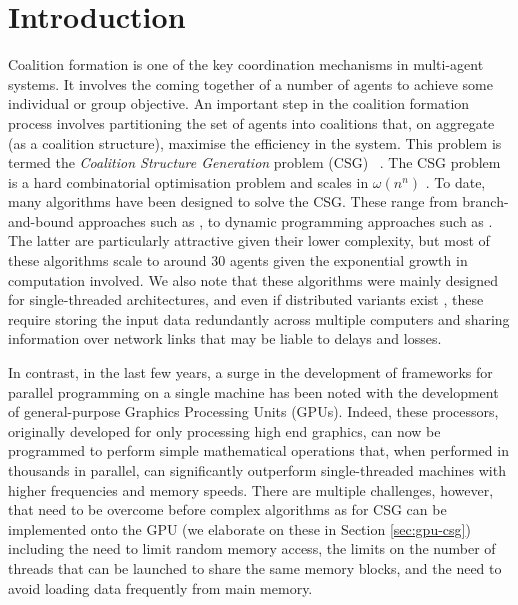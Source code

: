 \documentclass{llncs}
\begin{document}
\section{Introduction}
\noindent Coalition formation is one of the key coordination mechanisms in
multi-agent systems. It involves the coming together of a number of  agents to
achieve some individual or group objective.  An important step in the 
 coalition formation process involves partitioning the set of agents into coalitions that, on aggregate (as a coalition structure), maximise the efficiency in the system. This problem is termed the 
\emph{Coalition Structure Generation} problem (CSG)
~\cite{DBLP:journals/ai/SandholmLAST99}.   The  CSG problem is a hard combinatorial optimisation problem and scales in $\omega(n^n)$ \cite{DBLP:journals/ai/SandholmLAST99}. To date, many algorithms have been designed to solve the CSG. These range from branch-and-bound approaches such as \cite{rahwan2009anytime}, to dynamic programming approaches such as
\cite{DBLP:conf/atal/RahwanJ08,rahwan:jennings:2008b}. The latter are particularly attractive given their lower complexity, but most of these algorithms scale to around 30 agents given the exponential growth in computation involved. We also note that these algorithms were mainly designed for single-threaded architectures, and even if distributed variants exist \cite{michalak2010distributed}, these require storing the input data redundantly across multiple computers and sharing information over network links that may be liable to delays and losses. 

In contrast, in the last few years, a surge in the development of frameworks for parallel programming on a single machine has been noted with the development of general-purpose Graphics Processing Units (GPUs). Indeed, these processors, originally developed for only processing high end graphics, can now be programmed to perform simple mathematical operations that, when performed in thousands in parallel, can significantly outperform single-threaded machines with higher frequencies and memory speeds. There are multiple challenges, however, that need to be overcome before complex algorithms as for CSG can be implemented onto the GPU (we elaborate on these in Section \ref{sec:gpu-csg}) including the need to limit random memory access,  the limits on the number of threads that can be launched to share the same memory blocks, and the need to avoid loading data frequently from main memory. 
\end{document}
